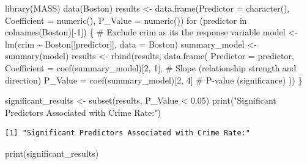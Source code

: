 \documentclass[
]{article}
\newenvironment{Shaded}{\begin{snugshade}}{\end{snugshade}}
\newcommand{\AttributeTok}[1]{\textcolor[rgb]{0.40,0.45,0.13}{#1}}
\newcommand{\CommentTok}[1]{\textcolor[rgb]{0.37,0.37,0.37}{#1}}
\newcommand{\ControlFlowTok}[1]{\textcolor[rgb]{0.00,0.23,0.31}{#1}}
\newcommand{\DecValTok}[1]{\textcolor[rgb]{0.68,0.00,0.00}{#1}}
\newcommand{\FloatTok}[1]{\textcolor[rgb]{0.68,0.00,0.00}{#1}}
\newcommand{\FunctionTok}[1]{\textcolor[rgb]{0.28,0.35,0.67}{#1}}
\newcommand{\NormalTok}[1]{\textcolor[rgb]{0.00,0.23,0.31}{#1}}
\newcommand{\OtherTok}[1]{\textcolor[rgb]{0.00,0.23,0.31}{#1}}
\newcommand{\SpecialCharTok}[1]{\textcolor[rgb]{0.37,0.37,0.37}{#1}}
\newcommand{\StringTok}[1]{\textcolor[rgb]{0.13,0.47,0.30}{#1}}
\begin{document}
\begin{Shaded}
\begin{Highlighting}[]
\FunctionTok{library}\NormalTok{(MASS)}
\FunctionTok{data}\NormalTok{(Boston)}
\NormalTok{results }\OtherTok{\textless{}{-}} \FunctionTok{data.frame}\NormalTok{(}\AttributeTok{Predictor =} \FunctionTok{character}\NormalTok{(), }\AttributeTok{Coefficient =} \FunctionTok{numeric}\NormalTok{(), }\AttributeTok{P\_Value =} \FunctionTok{numeric}\NormalTok{())}
\ControlFlowTok{for}\NormalTok{ (predictor }\ControlFlowTok{in} \FunctionTok{colnames}\NormalTok{(Boston)[}\SpecialCharTok{{-}}\DecValTok{1}\NormalTok{]) \{  }\CommentTok{\# Exclude \textasciigrave{}crim\textasciigrave{} as it\textquotesingle{}s the response variable}
\NormalTok{  model }\OtherTok{\textless{}{-}} \FunctionTok{lm}\NormalTok{(crim }\SpecialCharTok{\textasciitilde{}}\NormalTok{ Boston[[predictor]], }\AttributeTok{data =}\NormalTok{ Boston)}
\NormalTok{  summary\_model }\OtherTok{\textless{}{-}} \FunctionTok{summary}\NormalTok{(model)}
\NormalTok{  results }\OtherTok{\textless{}{-}} \FunctionTok{rbind}\NormalTok{(results, }\FunctionTok{data.frame}\NormalTok{(}
    \AttributeTok{Predictor =}\NormalTok{ predictor,}
    \AttributeTok{Coefficient =} \FunctionTok{coef}\NormalTok{(summary\_model)[}\DecValTok{2}\NormalTok{, }\DecValTok{1}\NormalTok{],  }\CommentTok{\# Slope (relationship strength and direction)}
    \AttributeTok{P\_Value =} \FunctionTok{coef}\NormalTok{(summary\_model)[}\DecValTok{2}\NormalTok{, }\DecValTok{4}\NormalTok{]      }\CommentTok{\# P{-}value (significance)}
\NormalTok{  ))}
\NormalTok{\}}

\NormalTok{significant\_results }\OtherTok{\textless{}{-}} \FunctionTok{subset}\NormalTok{(results, P\_Value }\SpecialCharTok{\textless{}} \FloatTok{0.05}\NormalTok{)}
\FunctionTok{print}\NormalTok{(}\StringTok{"Significant Predictors Associated with Crime Rate:"}\NormalTok{)}
\end{Highlighting}
\end{Shaded}

\begin{verbatim}
[1] "Significant Predictors Associated with Crime Rate:"
\end{verbatim}

\begin{Shaded}
\begin{Highlighting}[]
\FunctionTok{print}\NormalTok{(significant\_results)}
\end{Highlighting}
\end{Shaded}
\end{document}
